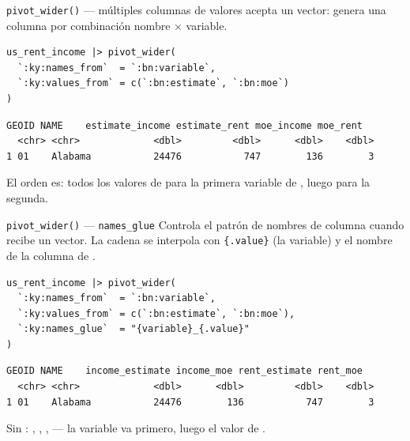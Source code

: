 \documentclass[8pt]{beamer}
\begin{document}
	\begin{frame}[fragile]{\texttt{pivot\_wider()} — múltiples columnas de valores}
		 acepta un vector: genera una columna por combinación nombre × variable.

		\begin{lstlisting}[style=RScript]
us_rent_income |> pivot_wider(
  `:ky:names_from`  = `:bn:variable`,
  `:ky:values_from` = c(`:bn:estimate`, `:bn:moe`)
)
\end{lstlisting}
		\begin{lstlisting}[style=RConsole]
  GEOID NAME    estimate_income estimate_rent moe_income moe_rent
  <chr> <chr>             <dbl>         <dbl>      <dbl>    <dbl>
1 01    Alabama           24476           747        136        3
\end{lstlisting}

		\begin{exampleblock}{}
			El orden es: todos los valores de  para la primera variable de , luego para la segunda.
		\end{exampleblock}
	\end{frame}

	\begin{frame}[fragile]{\texttt{pivot\_wider()} — \texttt{names\_glue}}
		Controla el patrón de nombres de columna cuando  recibe un vector. La cadena se interpola con \texttt{\{.value\}} (la variable) y el nombre de la columna de \rscript{names_from}.

		\begin{lstlisting}[style=RScript]
us_rent_income |> pivot_wider(
  `:ky:names_from`  = `:bn:variable`,
  `:ky:values_from` = c(`:bn:estimate`, `:bn:moe`),
  `:ky:names_glue`  = "{variable}_{.value}"
)
\end{lstlisting}
		\begin{lstlisting}[style=RConsole]
  GEOID NAME    income_estimate income_moe rent_estimate rent_moe
  <chr> <chr>             <dbl>      <dbl>         <dbl>    <dbl>
1 01    Alabama           24476        136           747        3
\end{lstlisting}

		\begin{exampleblock}{}
			Sin : , , ,  — la variable va primero, luego el valor de \rscript{names_from}.
		\end{exampleblock}
	\end{frame}
\end{document}
